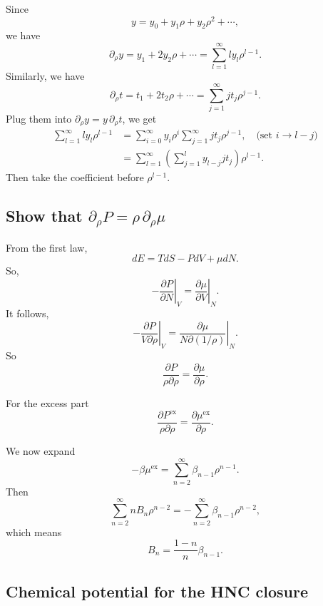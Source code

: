 \documentclass[aip,jcp,reprint,superscriptaddress]{revtex4-1}
\numberwithin{equation}{subsection}
\newcommand{\supex}[1]{ { { #1 }^{ \mathrm{ex} } } }
\newcommand{\Pex}{\supex{P}}
\newcommand{\muex}{\supex{\mu}}
\begin{document}
Since
\[
  y = y_0 + y_1 \rho + y_2 \rho^2 + \cdots,
\]
we have
\[
  \partial_\rho y = y_1  + 2 y_2 \rho + \cdots
  = \sum_{l = 1}^\infty l y_l \rho^{l-1}.
\]
Similarly, we have
\[
  \partial_\rho t = t_1  + 2 t_2 \rho + \cdots
  = \sum_{j = 1}^\infty j t_j \rho^{j-1}.
\]
Plug them into $\partial_\rho y = y \, \partial_\rho t$,
we get
\begin{align*}
  \sum_{l = 1}^\infty l y_l \rho^{l - 1}
&= \sum_{i = 0}^\infty y_i \rho^i
  \sum_{j = 1}^\infty j t_j \rho^{j - 1},
  \quad \mbox{(set $i \rightarrow l - j$)}
  \\
&=
  \sum_{l = 1}^\infty
  \left(
  \sum_{j = 1}^l y_{l - j} j t_j
  \right) \rho^{l - 1}.
\end{align*}
Then take the coefficient before $\rho^{l-1}$.



\subsection{Show that $\partial_\rho P = \rho \, \partial_\rho \mu$}

From the first law,
\[
  dE = T dS - P dV + \mu dN.
\]
So,
\[
  -\left. \frac{ \partial P } {\partial N} \right|_{V}
  = \left. \frac{ \partial \mu } { \partial V } \right|_{N}.
\]
It follows,
\[
  -\left. \frac{ \partial P } {V \partial \rho} \right|_{V}
  = \left. \frac{ \partial \mu } {N \partial (1/\rho) } \right|_{N}.
\]
So
\begin{equation}
  \frac{ \partial P } {\rho \partial \rho}
  = \frac{ \partial \mu } { \partial \rho }.
  \label{eq:Pmu}
\end{equation}

For the excess part
\begin{equation}
  \frac{ \partial  \Pex } {\rho \partial \rho}
  = \frac{ \partial \muex } { \partial \rho }.
  \label{eq:Pmu}
\end{equation}

We now expand
\begin{equation}
  -\beta \muex = \sum_{n = 2}^\infty \beta_{n-1} \rho^{n-1}.
  \label{eq:expandmu}
\end{equation}
Then
\[
  \sum_{n = 2}^\infty n B_n \rho^{n-2}
=
  -\sum_{n = 2}^\infty \beta_{n-1} \rho^{n-2},
\]
which means
\begin{equation}
  B_n = \frac{1-n}{n}\beta_{n-1}.
  \label{eq:Bbeta}
\end{equation}



\subsection{Chemical potential for the HNC closure}
\end{document}

